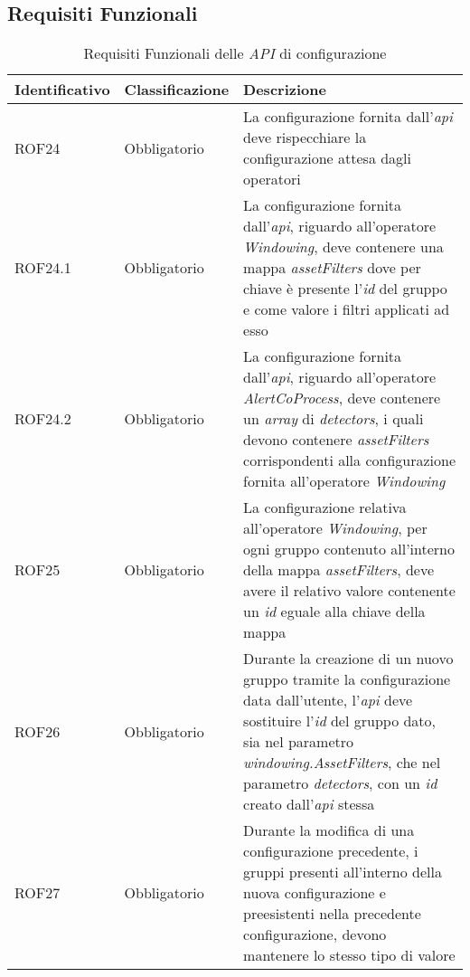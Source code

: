 \subsection{Requisiti Funzionali}
{
\centering
\begin{longtable}{L{3cm} L{3cm} L{7.5cm}}
\caption{Requisiti Funzionali delle \textit{API} di configurazione}\\
\textbf{Identificativo} &
\textbf{Classificazione}&
\textbf{Descrizione}\\
\endhead
\hline
ROF24 & Obbligatorio & La configurazione fornita dall'\textit{\gls{api}} deve rispecchiare la configurazione attesa dagli operatori\\
\hline
ROF24.1 & Obbligatorio & La configurazione fornita dall'\textit{\gls{api}}, riguardo all'operatore \textit{Windowing}, deve contenere una mappa \textit{assetFilters} dove per chiave è presente l'\textit{id} del gruppo e come valore i filtri applicati ad esso\\
\hline
ROF24.2 & Obbligatorio & La configurazione fornita dall'\textit{\gls{api}}, riguardo all'operatore \textit{AlertCoProcess}, deve contenere un \textit{array} di \textit{detectors}, i quali devono contenere \textit{assetFilters} corrispondenti alla configurazione fornita all'operatore \textit{Windowing}\\
\hline
ROF25 & Obbligatorio & La configurazione relativa all'operatore \textit{Windowing}, per ogni gruppo contenuto all'interno della mappa \textit{assetFilters}, deve avere il relativo valore contenente un \textit{id} eguale alla chiave della mappa\\
\hline
ROF26 & Obbligatorio & Durante la creazione di un nuovo gruppo tramite la configurazione data dall'utente, l'\textit{\gls{api}} deve sostituire l'\textit{id} del gruppo dato, sia nel parametro \textit{windowing.AssetFilters}, che nel parametro \textit{detectors}, con un \textit{id} creato dall'\textit{\gls{api}} stessa\\
\hline
ROF27 & Obbligatorio & Durante la modifica di una configurazione precedente, i gruppi presenti all'interno della nuova configurazione e preesistenti nella precedente configurazione, devono mantenere lo stesso tipo di valore\\
\hline
\end{longtable}
}

